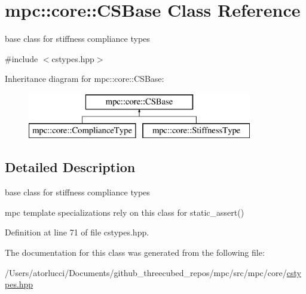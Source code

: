 \hypertarget{structmpc_1_1core_1_1_c_s_base}{}\section{mpc\+:\+:core\+:\+:C\+S\+Base Class Reference}
\label{structmpc_1_1core_1_1_c_s_base}


base class for stiffness compliance types  




{\ttfamily \#include $<$cstypes.\+hpp$>$}

Inheritance diagram for mpc\+:\+:core\+:\+:C\+S\+Base\+:\begin{figure}[H]
\begin{center}
\leavevmode
\includegraphics[height=2.000000cm]{structmpc_1_1core_1_1_c_s_base}
\end{center}
\end{figure}


\subsection{Detailed Description}
base class for stiffness compliance types 

mpc template specializations rely on this class for static\+\_\+assert() 

Definition at line 71 of file cstypes.\+hpp.



The documentation for this class was generated from the following file\+:\begin{DoxyCompactItemize}
\item 
/\+Users/atorlucci/\+Documents/github\+\_\+threecubed\+\_\+repos/mpc/src/mpc/core/\mbox{\hyperlink{cstypes_8hpp}{cstypes.\+hpp}}\end{DoxyCompactItemize}
